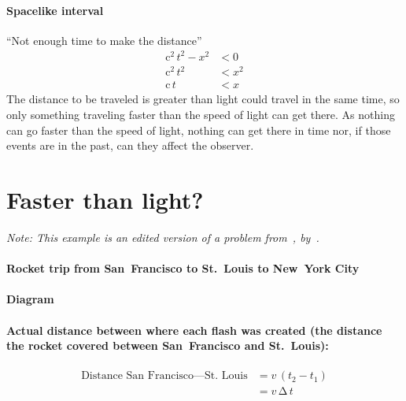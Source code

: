 \documentclass[pagesize,headsepline,10pt,parskip=half]{scrreprt}
\newcommand*\mdelta[1]{\ensuremath{\mathrm{\Delta\,}#1}}
\newcommand{\const}[1]{\ensuremath{\mathrm{#1}}}
\renewcommand{\c}{\const{c}}
\begin{document}
      \paragraph{Spacelike interval}
        \begin{samepage}
          ``Not enough time to make the distance''
          \begin{align*}
            \c^2 \, t^2 - x^2 &< 0\\
            \c^2 \, t^2 &< x^2\\
            \c \, t &< x
          \end{align*}
          The distance to be traveled is greater than light could travel
          in the same time, so only something traveling faster than
          the speed of light can get there.  As nothing can go faster than
          the speed of light, nothing can get there in time nor, if those
          events are in the past, can they affect the observer.
        \end{samepage}

    \section{Faster than light?}
        \emph{Note: This example is an edited version of a problem
          from~,
          by~\cite{taylor1992spacetime}.}
        \paragraph{Rocket trip from San~Francisco to St.~Louis to New~York City}
        \paragraph{Diagram}
        \paragraph{Actual distance between where each flash was created
          (the distance the rocket covered between San~Francisco and St.~Louis):}
          \begin{samepage}
            \begin{align*}
              \text{Distance San~Francisco---St.~Louis}
              &= v \, \left(t_2 - t_1\right)\\
              &= v \, \mdelta{t}
            \end{align*}
        \end{samepage}
\end{document}

